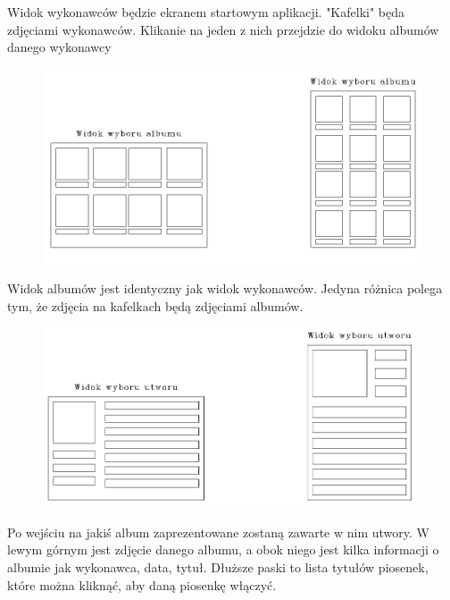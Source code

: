 Widok wykonawców będzie ekranem startowym aplikacji. "Kafelki" będa zdjęciami wykonawców. Klikanie na jeden z nich przejdzie do widoku albumów danego wykonawcy

\begin{figure}[H]
	\centering
	\includegraphics[width=1\linewidth]{images/mockup2_albumy}
	\caption{}
	\label{fig:mockup2albumy}
\end{figure}


Widok albumów jest identyczny jak widok wykonawców. Jedyna różnica polega tym, że zdjęcia na kafelkach będą zdjęciami albumów.

\begin{figure}[H]
	\centering
	\includegraphics[width=1\linewidth]{images/mockup2_utwory}
	\caption{}
	\label{fig:mockup2utwory}
\end{figure}



Po wejściu na jakiś album zaprezentowane zostaną zawarte w nim utwory. W lewym górnym jest zdjęcie danego albumu, a obok niego jest kilka informacji o albumie jak wykonawca, data, tytuł. Dłuższe paski to lista tytułów piosenek, które można kliknąć, aby daną piosenkę włączyć.


